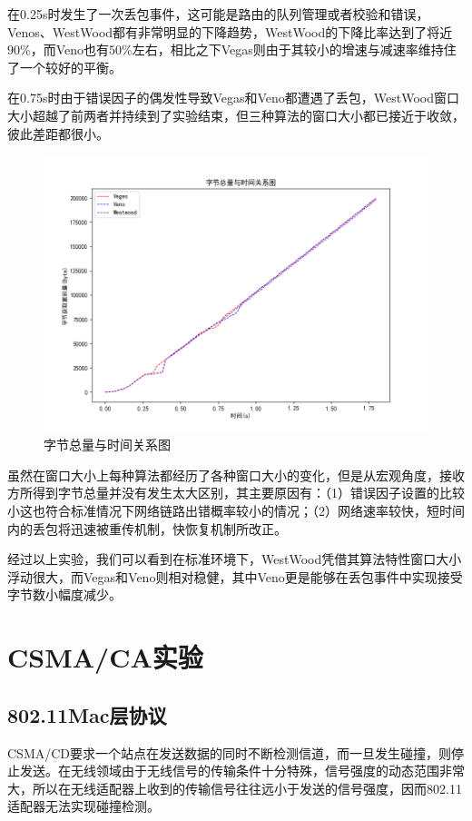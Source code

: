 \documentclass{article}
\begin{document}
在0.25s时发生了一次丢包事件，这可能是路由的队列管理或者校验和错误，Venos、WestWood都有非常明显的下降趋势，WestWood的下降比率达到了将近$90\%$，而Veno也有$50\%$左右，相比之下Vegas则由于其较小的增速与减速率维持住了一个较好的平衡。

在0.75s时由于错误因子的偶发性导致Vegas和Veno都遭遇了丢包，WestWood窗口大小超越了前两者并持续到了实验结束，但三种算法的窗口大小都已接近于收敛，彼此差距都很小。

\begin{figure}[H]
	\centering
	\includegraphics[scale=0.6]{picture/byteTcp.png}
	\caption{字节总量与时间关系图}
	\label{fig:byteTCP}
\end{figure}

虽然在窗口大小上每种算法都经历了各种窗口大小的变化，但是从宏观角度，接收方所得到字节总量并没有发生太大区别，其主要原因有：（1）错误因子设置的比较小这也符合标准情况下网络链路出错概率较小的情况；（2）网络速率较快，短时间内的丢包将迅速被重传机制，快恢复机制所改正。

经过以上实验，我们可以看到在标准环境下，WestWood凭借其算法特性窗口大小浮动很大，而Vegas和Veno则相对稳健，其中Veno更是能够在丢包事件中实现接受字节数小幅度减少。

\section{CSMA/CA实验}
\subsection{802.11Mac层协议}

CSMA/CD要求一个站点在发送数据的同时不断检测信道，而一旦发生碰撞，则停止发送。在无线领域由于无线信号的传输条件十分特殊，信号强度的动态范围非常大，所以在无线适配器上收到的传输信号往往远小于发送的信号强度，因而802.11适配器无法实现碰撞检测。
\end{document}
